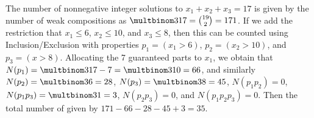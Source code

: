\documentclass[a4paper]{article}
\begin{document}
\begin{example}
The number of nonnegative integer solutions to $x_1+x_2+x_3=17$ is given by the number of weak compositions as $\multbinom 3{17}=\binom{19}2=171$. If we add the restriction that $x_1\leq 6$, $x_2\leq10$, and $x_3\leq8$, then this can be counted using Inclusion/Exclusion with properties $p_1=(x_1>6)$, $p_2=(x_2>10)$, and $p_3=(x>8)$. Allocating the 7 guaranteed parts to $x_1$, we obtain that $N(p_1)=\multbinom 3{17-7}=\multbinom3{10}=66$, and similarly $N(p_2)=\multbinom3{6}=28$, $N(p_3)=\multbinom 38=45$, $N(p_1p_2)=0$, $N(p_1p_3)=\multbinom 31=3$, $N(p_2p_3)=0$, and $N(p_1p_2p_3)=0$. Then the total number of given by $171-66-28-45+3=35$.
\end{example}
\end{document}
